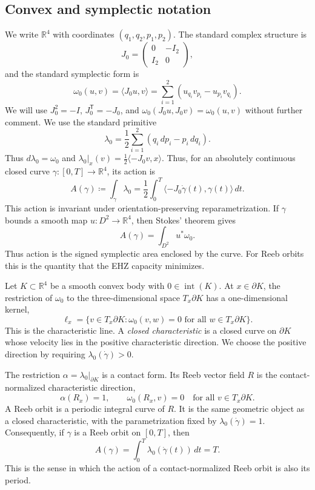 \subsection{Convex and symplectic notation}\label{subsec:preliminaries-polytopes}

We write \(\mathbb{R}^4\) with coordinates \((q_1,q_2,p_1,p_2)\). The standard
complex structure is
\[
  J_0 =
  \begin{pmatrix}
    0 & -I_2 \\
    I_2 & 0
  \end{pmatrix},
\]
and the standard symplectic form is
\[
  \omega_0(u,v) = \langle J_0u,v\rangle
  = \sum_{i=1}^2 (u_{q_i}v_{p_i}-u_{p_i}v_{q_i}).
\]
We will use \(J_0^2=-I\), \(J_0^{\mathsf T}=-J_0\), and
\(\omega_0(J_0u,J_0v)=\omega_0(u,v)\) without further comment.
We use the standard primitive
\[
  \lambda_0 = \frac{1}{2}\sum_{i=1}^2(q_i\,dp_i-p_i\,dq_i).
\]
Thus \(d\lambda_0=\omega_0\) and
\(\lambda_0|_x(v)=\frac12\langle -J_0v,x\rangle\).
Thus, for an absolutely continuous closed curve
\(\gamma\colon[0,T]\to\mathbb{R}^4\), its action is
\begin{equation}\label{eq:preliminaries-action}
  A(\gamma) \coloneqq \int_\gamma \lambda_0
  = \frac{1}{2}\int_0^T
    \langle -J_0\dot{\gamma}(t),\gamma(t)\rangle\,dt.
\end{equation}
This action is invariant under orientation-preserving reparametrization.
If \(\gamma\) bounds a smooth map \(u\colon D^2\to\mathbb{R}^4\), then Stokes'
theorem gives
\[
  A(\gamma)=\int_{D^2}u^*\omega_0.
\]
Thus action is the signed symplectic area enclosed by the curve. For Reeb
orbits this is the quantity that the EHZ capacity minimizes.

Let \(K\subset\mathbb{R}^4\) be a smooth convex body with
\(0\in\operatorname{int}(K)\). At \(x\in\partial K\), the restriction of
\(\omega_0\) to the three-dimensional space \(T_x\partial K\) has a
one-dimensional kernel,
\[
  \ell_x
  =
  \{v\in T_x\partial K:\omega_0(v,w)=0
    \text{ for all }w\in T_x\partial K\}.
\]
This is the characteristic line. A \emph{closed characteristic} is a closed
curve on \(\partial K\) whose velocity lies in the positive characteristic
direction. We choose the positive direction by requiring
\(\lambda_0(\dot{\gamma})>0\).

The restriction \(\alpha=\lambda_0|_{\partial K}\) is a contact form. Its Reeb
vector field \(R\) is the contact-normalized characteristic direction,
\[
  \alpha(R_x)=1,
  \qquad
  \omega_0(R_x,v)=0
  \quad\text{for all }v\in T_x\partial K.
\]
A Reeb orbit is a periodic integral curve of \(R\). It is the same geometric
object as a closed characteristic, with the parametrization fixed by
\(\lambda_0(\dot{\gamma})=1\). Consequently, if \(\gamma\) is a Reeb orbit on
\([0,T]\), then
\[
  A(\gamma)=\int_0^T\lambda_0(\dot{\gamma}(t))\,dt=T.
\]
This is the sense in which the action of a contact-normalized Reeb orbit is
also its period.
